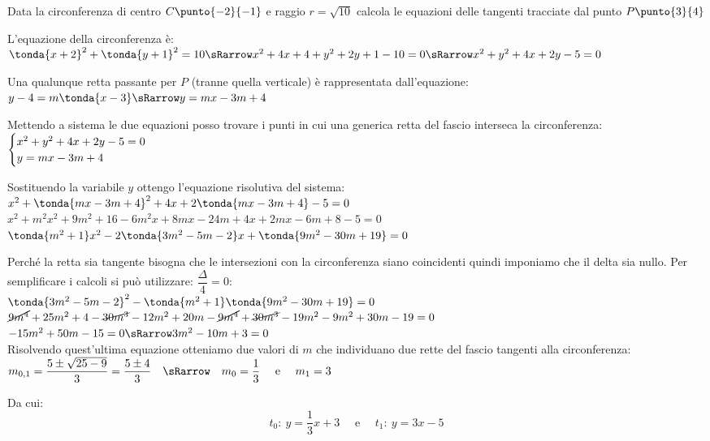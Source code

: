 \begin{esempio}
Data la circonferenza di centro \(C\punto{-2}{-1}\) e raggio \(r=\sqrt{10}\) 
calcola le equazioni delle tangenti tracciate dal punto \(P\punto{3}{4}\)

\begin{center}
\begin{inaccessibleblock}
  \circtangenti
  \label{fig:circ_circtangenti}
\end{inaccessibleblock}
\end{center}

L'equazione della circonferenza è: \\
\(\tonda{x +2}^2 + \tonda{y+1}^2 = 10
\sRarrow x^2 +4x +4 +y^2 +2y +1 -10 = 0
\sRarrow x^2 +y^2 +4x +2y -5 = 0\)

Una qualunque retta passante per \(P\) (tranne quella verticale) è rappresentata dall'equazione: \\
\(y -4 = m \tonda{x -3} \sRarrow y = mx -3m +4\)

Mettendo a sistema le due equazioni posso trovare i punti in cui una generica 
retta del fascio interseca la circonferenza: \\
\(\begin{cases}x^2 +y^2 +4x +2y -5 = 0 \\ y = mx -3m +4\end{cases}\)

Sostituendo la variabile \(y\) ottengo l'equazione risolutiva del sistema: \\
\(x^2 +\tonda{mx -3m +4}^2 +4x +2\tonda{mx -3m +4} -5 = 0 \)\\
\(x^2 +m^2x^2 +9m^2 +16 -6m^2x +8mx -24m +4x +2mx -6m +8 -5 = 0 \)\\
\(\tonda{m^2 +1}x^2 - 2\tonda{3m^2 -5m -2}x +\tonda{9m^2 -30m +19} = 0 \)

Perché la retta sia tangente bisogna che le intersezioni con la circonferenza 
siano coincidenti quindi imponiamo che il delta sia nullo. Per semplificare i calcoli si può utilizzare: \(\dfrac{\Delta}{4} = 0\): \\
\(\tonda{3m^2 -5m -2}^2 - \tonda{m^2 +1} \tonda{9m^2 -30m +19} = 0 \) \\
\(\cancel{9m^4} +25m^2 +4 -\cancel{30m^3} -12m^2 + 20 m -
\cancel{9m^4} +\cancel{30m^3} -19m^2 -9m^2 +30m -19= 0 \) \\
\(-15m^2 +50 m -15= 0 \sRarrow 3m^2 -10m +3 = 0\) \\

Risolvendo quest'ultima equazione otteniamo due valori di \(m\) che individuano 
due rette del fascio tangenti alla circonferenza: \\
\(m_{0, 1} = \dfrac{5 \pm \sqrt{25-9}}{3} = \dfrac{5 \pm 4}{3} \quad \sRarrow
\quad m_0 = \dfrac{1}{3} \quad \text{ e } \quad m_1 = 3\)

Da cui: 
\[t_0:~y = \dfrac{1}{3}x +3 \quad \text{ e } \quad t_1:~y = 3x -5\]

\end{esempio}

